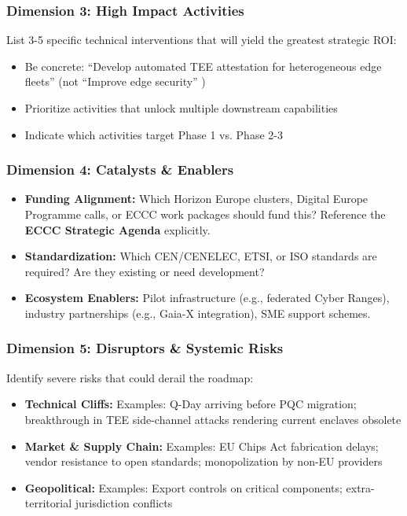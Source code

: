 \documentclass[12pt,a4paper]{article}
\begin{document}
\subsubsection*{Dimension 3: High Impact Activities}
List 3-5 specific technical interventions that will yield the greatest strategic ROI:
\begin{itemize}
    \item Be concrete: ``Develop automated TEE attestation for heterogeneous edge fleets''  (not ``Improve edge security'' )
    \item Prioritize activities that unlock multiple downstream capabilities
    \item Indicate which activities target Phase 1 vs. Phase 2-3
\end{itemize}

\subsubsection*{Dimension 4: Catalysts \& Enablers}
\begin{itemize}
    \item \textbf{Funding Alignment:} Which Horizon Europe clusters, Digital Europe Programme calls, or ECCC work packages should fund this? Reference the \textbf{ECCC Strategic Agenda} explicitly.
    \item \textbf{Standardization:} Which CEN/CENELEC, ETSI, or ISO standards are required? Are they existing or need development?
    \item \textbf{Ecosystem Enablers:} Pilot infrastructure (e.g., federated Cyber Ranges), industry partnerships (e.g., Gaia-X integration), SME support schemes.
\end{itemize}

\subsubsection*{Dimension 5: Disruptors \& Systemic Risks}
Identify severe risks that could derail the roadmap:
\begin{itemize}
    \item \textbf{Technical Cliffs:} Examples: Q-Day arriving before PQC migration; breakthrough in TEE side-channel attacks rendering current enclaves obsolete
    \item \textbf{Market \& Supply Chain:} Examples: EU Chips Act fabrication delays; vendor resistance to open standards; monopolization by non-EU providers
    \item \textbf{Geopolitical:} Examples: Export controls on critical components; extra-territorial jurisdiction conflicts
\end{itemize}
\end{document}
